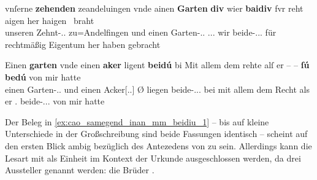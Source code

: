 \begin{exe}
\ex \label{ex:cao_samegend_inan_mm_beidiu}
	\begin{xlist}
	\ex \label{ex:cao_samegend_inan_mm_beidiu_1}
		\gll vnſerne \textbf{zehenden} zeandeluingen vnde ainen \textbf{Garten}
				\textelp{} \textbf{div} wier \textbf{baidiv} fvr reht aigen her
				haigen~ braht \\
			unseren Zehnt-\Acc.\Sg{}.\MascI{} zu=Andelfingen und einen
				Garten-\Acc.\Sg.\MascI{} {} \Rel.\Acc.\Pl.\NeutI{} wir
				beide-\Acc.\Pl{}.\NeutI.\St{} für rechtmäßig Eigentum her haben
				gebracht \\
		\begin{taggedline}{\parencites(Kl.~Heiligkreuztal, Kr.~Biberach, 1290)[\pno~1201~AB, 472.10--18]{cao2}}
		\trans {}
		\end{taggedline}

	\ex \label{ex:cao_samegend_inan_mm_beidiu_2}
		\gll Einen \textbf{garten} vnde einen \textbf{aker} {}
				ligent \textbf{beidú} bi \textelp{} Mit allem dem rehte alſ er
				{-- --} \textbf{ſú} \textbf{bedú} von mir hatte \\
			einen Garten-\Acc.\Sg.\MascI{} und einen Acker[\Acc.\Sg.\MascI]
				Ø liegen beide-\Nom.\Pl.\NeutI.\St{} bei {} mit allem dem
				Recht als er {} \Tpl.\Acc{} beide-\Acc.\Pl.\NeutI.\St{} von mir
				hatte \\
		\begin{taggedline}{\parencites(Freiburg i.\,Br., 1299)[\pno~3249, 417.4--6]{cao4}}
		\trans {}
		\end{taggedline}
	\end{xlist}
\end{exe}

Der Beleg in \cref{ex:cao_samegend_inan_mm_beidiu_1} -- bis auf kleine
Unterschiede in der Großschreibung sind beide Fassungen identisch -- scheint
auf den ersten Blick ambig bezüglich des Antezedens von  zu sein.
Allerdings kann die Lesart mit   als Einheit
im Kontext der Urkunde ausgeschlossen werden, da drei Aussteller genannt
werden: die Brüder 
\autocite[\pno~1201~AB, 472.7]{cao2}.

